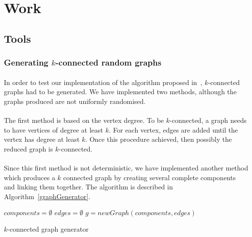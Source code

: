 \section{Work}

\subsection{Tools}
\subsubsection{Generating $k$-connected random graphs}
\paragraph{}
In order to test our implementation of the algorithm proposed in~\cite{JS94},
$k$-connected  graphs had to be generated. We have implemented two methods,
although the graphs produced are not uniformly randomised.

\paragraph{}
The first method is based on the vertex degree. To be $k$-connected, a graph
needs to have vertices of degree at least $k$. For each vertex, edges are added
until the vertex has degree at least $k$. Once this procedure achieved, then
possibly the reduced graph is $k$-connected.

\paragraph{}
Since this first method is not deterministic, we have implemented another method
which produces a $k$ connected graph by creating several complete
components and linking them together. The algorithm is described in
Algorithm~\ref{graphGenerator}.

\begin{algorithm}[!h]
  $components = \emptyset$\;
  $edges = \emptyset$\;
  $g = newGraph(components, edges)$\;
  \;
  \caption{\label{graphGenerator}$k$-connected graph generator}
\end{algorithm}

